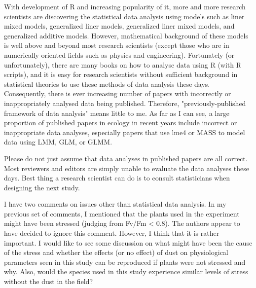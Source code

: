 \documentclass[parskip=half]{scrartcl}
\begin{document}
With development of R and increasing popularity of it, more and more research scientists are discovering the statistical data analysis using models such as liner mixed models, generalized liner models, generalized liner mixed models, and generalized additive models. However, mathematical background of these models is well above and beyond most research scientists (except those who are in numerically oriented fields such as physics and engineering).  Fortunately (or unfortunately), there are many books on how to analyse data using R (with R scripts), and it is easy for research scientists without sufficient background in statistical theories to use these methods of data analysis these days.  Consequently, there is ever increasing number of papers with incorrectly or inappropriately analysed data being published. 
Therefore, "previously-published framework of data analysis" means little to me.  As far as I can see, a large proportion of published papers in ecology in recent years include incorrect or inappropriate data analyses, especially papers that use lme4 or MASS to model data using LMM, GLM, or GLMM.   

Please do not just assume that data analyses in published papers are all correct. 
Most reviewers and editors are simply unable to evaluate the data analyses these days.
Best thing a research scientist can do is to consult statisticians when designing the next study.

I have two comments on issues other than statistical data analysis.
In my previous set of comments, I mentioned that the plants used in the experiment might have been stressed (judging from Fv/Fm < 0.8).
The authors appear to have decided to ignore this comment.
However, I think that it is rather important.
I would like to see some discussion on what might have been the cause of the stress and whether the effects (or no effect) of dust on physiological parameters seen in this study can be reproduced if plants were not stressed and why.
Also, would the species used in this study experience similar levels of stress without the dust in the field?
\end{document}
